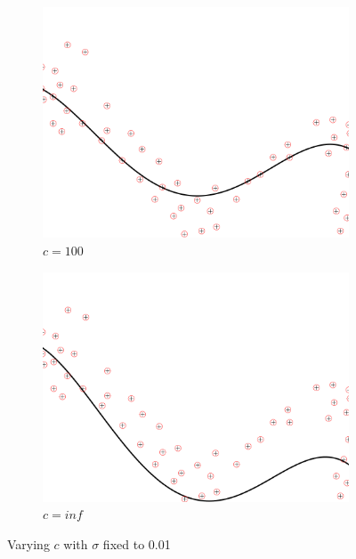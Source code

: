 \documentclass[a4paper, 11pt, one column]{article}
\begin{document}
\begin{figure}[]
\begin{subfigure}{0.33\linewidth}
            \includegraphics[width=\linewidth]{images/rbf_2_c_100.png}
            \caption{$c=100$}
        \end{subfigure}\hfil
        \begin{subfigure}{0.33\linewidth}
            \includegraphics[width=\linewidth]{images/rbf_2_c_inf.png}
            \caption{$c=inf$}
        \end{subfigure}\hfil
        \caption{Varying $c$ with $\sigma$ fixed to 0.01}
        \label{fig:decreasingc}
\end{figure}
\end{document}
